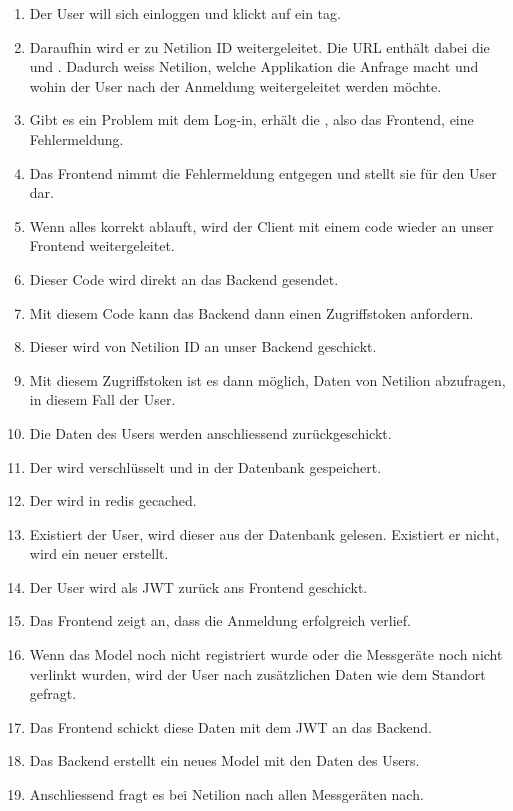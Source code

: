 \begin{enumerate}
  \item Der User will sich einloggen und klickt auf ein  tag.
  \item Daraufhin wird er zu Netilion ID weitergeleitet. Die URL enthält dabei die  und \newline{}. Dadurch weiss Netilion, welche Applikation die Anfrage macht und wohin der User nach der Anmeldung weitergeleitet werden möchte.
  \item Gibt es ein Problem mit dem Log-in, erhält die , also das Frontend, eine Fehlermeldung.
  \item Das Frontend nimmt die Fehlermeldung entgegen und stellt sie für den User dar.
  \item Wenn alles korrekt ablauft, wird der Client mit einem code wieder an unser Frontend weitergeleitet.
  \item Dieser Code wird direkt an das Backend gesendet.
  \item Mit diesem Code kann das Backend dann einen Zugriffstoken anfordern.
  \item Dieser wird von Netilion ID an unser Backend geschickt.
  \item Mit diesem Zugriffstoken ist es dann möglich, Daten von Netilion abzufragen, in diesem Fall der User.
  \item Die Daten des Users werden anschliessend zurückgeschickt.
  \item Der  wird verschlüsselt und in der Datenbank gespeichert.
  \item Der  wird in redis gecached.
  \item Existiert der User, wird dieser aus der Datenbank gelesen. Existiert er nicht, wird ein neuer erstellt.
  \item Der User wird als JWT zurück ans Frontend geschickt.
  \item Das Frontend zeigt an, dass die Anmeldung erfolgreich verlief.
  \item Wenn das Model noch nicht registriert wurde oder die Messgeräte noch nicht verlinkt wurden, wird der User nach zusätzlichen Daten wie dem Standort gefragt.
  \item Das Frontend schickt diese Daten mit dem JWT an das Backend.
  \item Das Backend erstellt ein neues Model mit den Daten des Users.
  \item Anschliessend fragt es bei Netilion nach allen Messgeräten nach.

\end{enumerate}
